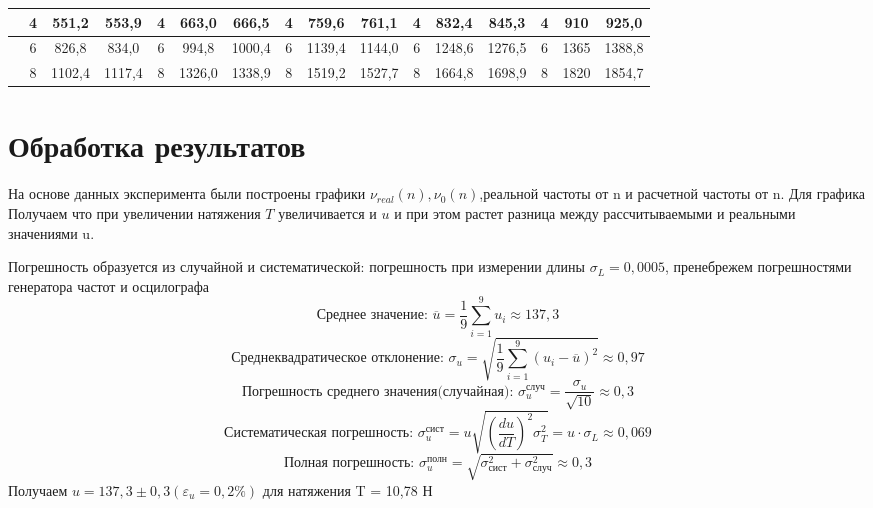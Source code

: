 \documentclass[a4paper]{article}
\begin{document}
\begin{table}[!h]
\begin{tabular}{|c|ccc|ccc|ccc|ccc|ccc|}
                                                             & \multicolumn{1}{c|}{4}  & \multicolumn{1}{c|}{551,2}         & 553,9               & \multicolumn{1}{c|}{4}  & \multicolumn{1}{c|}{663,0}         & 666,5              & \multicolumn{1}{c|}{4}  & \multicolumn{1}{c|}{759,6}         & 761,1              & \multicolumn{1}{c|}{4}  & \multicolumn{1}{c|}{832,4}         & 845,3              & \multicolumn{1}{c|}{4}  & \multicolumn{1}{c|}{910}           & 925,0              \\ \hline
                                                             & \multicolumn{1}{c|}{6}  & \multicolumn{1}{c|}{826,8}         & 834,0              & \multicolumn{1}{c|}{6}  & \multicolumn{1}{c|}{994,8}         & 1000,4              & \multicolumn{1}{c|}{6}  & \multicolumn{1}{c|}{1139,4}        & 1144,0             & \multicolumn{1}{c|}{6}  & \multicolumn{1}{c|}{1248,6}        & 1276,5             & \multicolumn{1}{c|}{6}  & \multicolumn{1}{c|}{1365}          & 1388,8             \\ \hline
                                                             & \multicolumn{1}{c|}{8}  & \multicolumn{1}{c|}{1102,4}        & 1117,4             & \multicolumn{1}{c|}{8}  & \multicolumn{1}{c|}{1326,0}        & 1338,9             & \multicolumn{1}{c|}{8}  & \multicolumn{1}{c|}{1519,2}        & 1527,7             & \multicolumn{1}{c|}{8}  & \multicolumn{1}{c|}{1664,8}        & 1698,9             & \multicolumn{1}{c|}{8}  & \multicolumn{1}{c|}{1820}          & 1854,7             \\ \hline
    
    \end{tabular}
    \end{table}


\section{Обработка результатов}

На основе данных эксперимента были построены графики $\nu_{real}(n), \nu_{0}(n)$,реальной частоты от n и расчетной частоты от n.
Для графика 
Получаем что при увеличении натяжения $T$ увеличивается и $u$ и при этом растет разница между рассчитываемыми и реальными значениями u. 

Погрешность образуется из случайной и систематической: погрешность при измерении длины  $\sigma_{L} = 0,0005$, пренебрежем погрешностями генератора частот и осцилографа
\[\text{Среднее значение:  } \overline{u} = \frac{1}{9}\sum\limits_{i=1}^{9} u_{i} \approx 137,3\]
\[\text{Среднеквадратическое отклонение:  } \sigma_{u} = \sqrt{\frac{1}{9}\sum\limits_{i=1}^{9} (u_{i} - \overline{u})^2} \approx 0,97\]
\[\text{Погрешность среднего значения(случайная):  } \sigma_{u}^{\text{случ}} = \frac{\sigma_{u}}{\sqrt{10}} \approx 0,3\]
\[\text{Систематическая погрешность:  }\sigma_{u}^{\text{сист}} = u\sqrt{\left( \frac{du}{dT}\right)^2 \sigma_{T}^2} = u \cdot \sigma_{L} \approx 0,069\]
\[\text{Полная погрешность:  }\sigma_{u}^{\text{полн}} = \sqrt{\sigma_{\text{сист}}^2 + \sigma_{\text{случ}}^2} \approx 0,3\]
Получаем $u = 137,3 \pm 0,3 (\varepsilon_{u} = 0,2\%)$ для натяжения T = 10,78 Н
\end{document}
